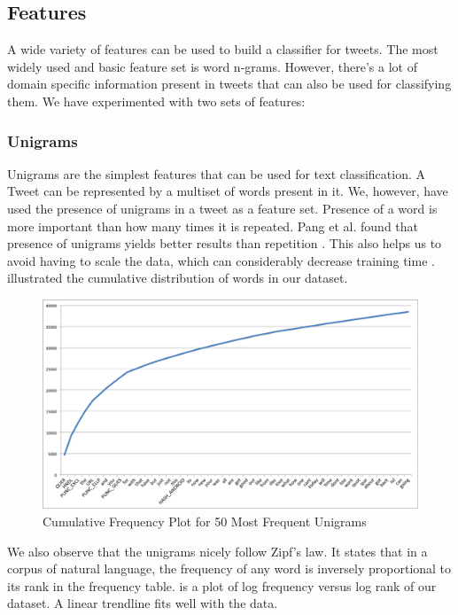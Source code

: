 \subsection{Features}
A wide variety of features can be used to build a classifier for tweets. The most widely used and basic feature set is word n-grams. However, there's a lot of domain specific information present in tweets that can also be used for classifying them. We have experimented with two sets of features:

\subsubsection{Unigrams}
Unigrams are the simplest features that can be used for text classification. A Tweet can be represented by a multiset of words present in it. We, however, have used the presence of unigrams in a tweet as a feature set. Presence of a word is more important than how many times it is repeated. Pang et al. found that presence of unigrams yields better results than repetition \cite{survey}. This also helps us to avoid having to scale the data, which can considerably decrease training time \cite{GBH}.  illustrated the cumulative distribution of words in our dataset.

\begin{figure}[h!]
\centering
\includegraphics[width=\textwidth]{img/1grams.png}
\caption{Cumulative Frequency Plot for 50 Most Frequent Unigrams}
\label{fig:1grams}
\end{figure}

We also observe that the unigrams nicely follow Zipf’s law. It states that in a corpus of natural language, the frequency of any word is inversely proportional to its rank in the frequency table.  is a plot of log frequency versus log rank of our dataset. A linear trendline fits well with the data.

